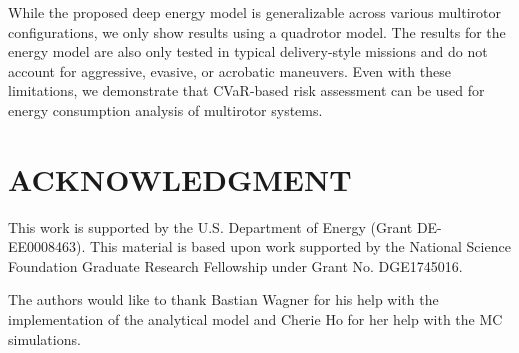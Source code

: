 \documentclass[letterpaper, 10 pt, conference]{ieeeconf}
\begin{document}
While the proposed deep energy model is generalizable across various multirotor configurations, we only show results using a quadrotor model. The results for the energy model are also only tested in typical delivery-style missions and do not account for aggressive, evasive, or acrobatic maneuvers. Even with these limitations, we demonstrate that CVaR-based risk assessment can be used for energy consumption analysis of multirotor systems.    



















\section*{ACKNOWLEDGMENT}
This work is supported by the U.S. Department of Energy (Grant DE-EE0008463). This material is based upon work supported by the National Science Foundation Graduate Research Fellowship under Grant No. DGE1745016.

The authors would like to thank Bastian Wagner for his help with the implementation of the analytical model and Cherie Ho for her help with the MC simulations. 







\end{document}

